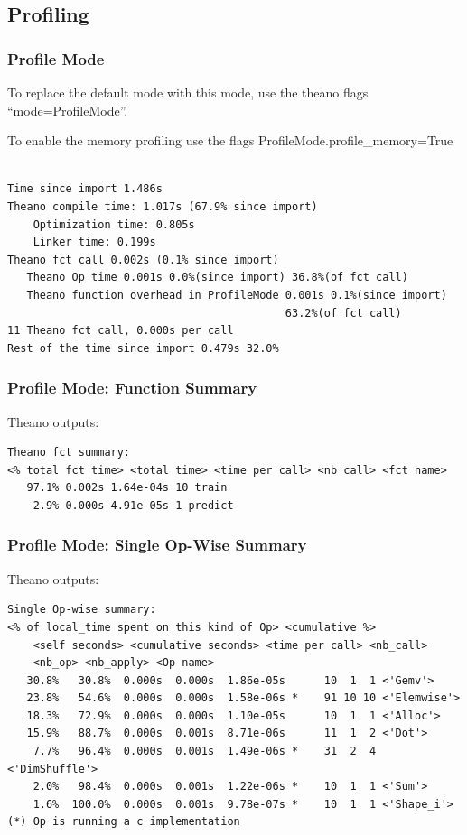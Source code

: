 \documentclass[a4paper,9pt]{beamer}
\begin{document}
\subsection{Profiling}
\begin{frame}[fragile]
\frametitle{Profile Mode}
To replace the default mode with this mode, use the theano flags ``mode=ProfileMode''.

To enable the memory profiling use the flags ProfileMode.profile\_memory=True 
\begin{Verbatim}

Time since import 1.486s
Theano compile time: 1.017s (67.9% since import)
    Optimization time: 0.805s
    Linker time: 0.199s
Theano fct call 0.002s (0.1% since import)
   Theano Op time 0.001s 0.0%(since import) 36.8%(of fct call)
   Theano function overhead in ProfileMode 0.001s 0.1%(since import) 
                                           63.2%(of fct call)
11 Theano fct call, 0.000s per call
Rest of the time since import 0.479s 32.0%

\end{Verbatim}
\end{frame}

\begin{frame}[fragile]
\frametitle{Profile Mode: Function Summary}
Theano outputs:
\vfill
\begin{Verbatim}
Theano fct summary:
<% total fct time> <total time> <time per call> <nb call> <fct name>
   97.1% 0.002s 1.64e-04s 10 train
    2.9% 0.000s 4.91e-05s 1 predict
\end{Verbatim}
\end{frame}

\begin{frame}[fragile]
\frametitle{Profile Mode: Single Op-Wise Summary}
Theano outputs:
\vfill
\begin{Verbatim}
Single Op-wise summary:
<% of local_time spent on this kind of Op> <cumulative %> 
    <self seconds> <cumulative seconds> <time per call> <nb_call>
    <nb_op> <nb_apply> <Op name>
   30.8%   30.8%  0.000s  0.000s  1.86e-05s      10  1  1 <'Gemv'>
   23.8%   54.6%  0.000s  0.000s  1.58e-06s *    91 10 10 <'Elemwise'>
   18.3%   72.9%  0.000s  0.000s  1.10e-05s      10  1  1 <'Alloc'>
   15.9%   88.7%  0.000s  0.001s  8.71e-06s      11  1  2 <'Dot'>
    7.7%   96.4%  0.000s  0.001s  1.49e-06s *    31  2  4 <'DimShuffle'>
    2.0%   98.4%  0.000s  0.001s  1.22e-06s *    10  1  1 <'Sum'>
    1.6%  100.0%  0.000s  0.001s  9.78e-07s *    10  1  1 <'Shape_i'>
(*) Op is running a c implementation

\end{Verbatim}
\end{frame}
\end{document}
